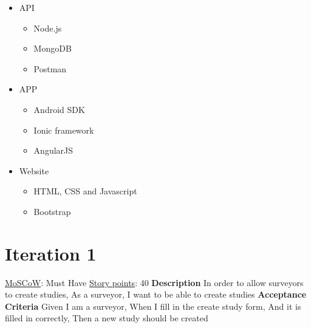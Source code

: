 \documentclass[12pt, a4paper]{report}
\begin{document}
\begin{itemize}
    \item API
    \begin{itemize}
        \item Node.js
        \item MongoDB
        \item Postman
    \end{itemize}
    \item APP
    \begin{itemize}
        \item Android SDK
        \item Ionic framework
        \item AngularJS
    \end{itemize}
    \item Website
    \begin{itemize}
        \item HTML, CSS and Javascript
        \item Bootstrap
    \end{itemize}
    
\end{itemize}
\section{Iteration 1}
\vspace*{5px}
\begin{tcolorbox}[width=\textwidth,colback={White},title={\textbf {Creation of Studies}},colbacktitle=grey,coltitle=black]
\underline{MoSCoW}: Must Have 
\hfill
\underline {Story points}: 40
\newline
\newline
 \blindtext \textbf{Description}
 \newline
In order to allow surveyors to create studies,
\newline
As a surveyor,\newline
I want to be able to create studies
\newline
\newline
 \textbf{Acceptance Criteria}
\newline
Given I am a surveyor,\newline
When I fill in the create study form,\newline
And it is filled in correctly,\newline
Then a new study should be created
\end{tcolorbox} 

\vspace*{20px}
\end{document}
